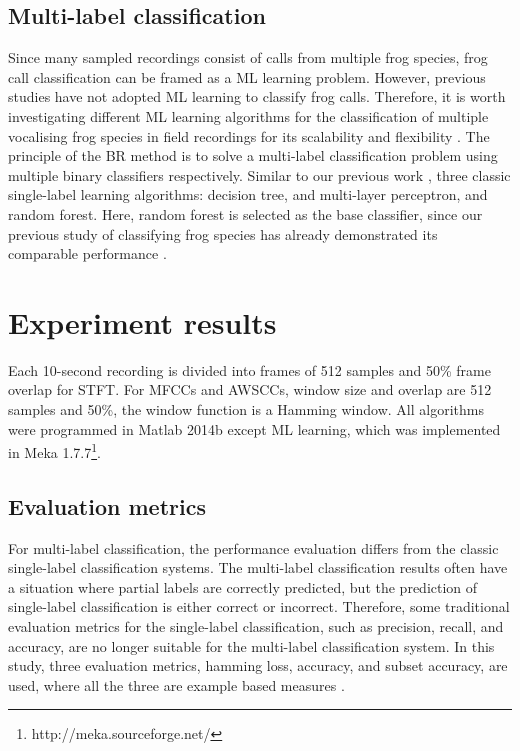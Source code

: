 \subsection{Multi-label classification} 
Since many sampled recordings consist of calls from multiple frog species, frog call classification can be framed as a ML learning problem. However, previous studies have not adopted ML learning to classify frog calls. Therefore, it is worth investigating different ML learning algorithms for the classification of multiple vocalising frog species in field recordings for its scalability and flexibility \citep{read2011classifier}. The principle of the BR method is to solve a multi-label classification problem using multiple binary classifiers respectively. Similar to our previous work \citep{zhang2016using}, 
three classic single-label learning algorithms: decision tree, and multi-layer perceptron, and random forest. Here, random forest is selected as the base classifier, since our previous study of classifying frog species has already demonstrated its comparable performance \citep{xie2016acoustic}. 

\section{Experiment results}
Each 10-second recording is divided into frames of 512 samples and 50\% frame overlap for STFT. For MFCCs and AWSCCs, window size and overlap are 512 samples and 50\%, the window function is a Hamming window. All algorithms were programmed in Matlab 2014b except ML learning, which was implemented in Meka 1.7.7\footnote[4]{http://meka.sourceforge.net/}. 







\subsection{Evaluation metrics}
For multi-label classification, the performance evaluation differs from the classic single-label classification systems. The multi-label classification results often have a situation where partial labels are correctly predicted, but the prediction of single-label classification is either correct or incorrect. Therefore, some traditional evaluation metrics for the single-label classification, such as precision, recall, and accuracy, are no longer suitable for the multi-label classification system. In this study, three evaluation metrics, hamming loss, accuracy, and subset accuracy, are used, where all the three are example based measures \citep{madjarov2012extensive}.


